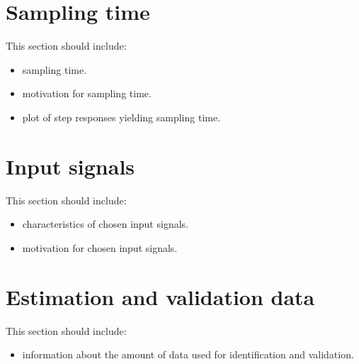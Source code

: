 \documentclass[10pt,a4paper]{article}
\begin{document}
\section{Sampling time}
This section should include:
\begin{itemize}
    \item sampling time.
    \item motivation for sampling time.
    \item plot of step responses yielding sampling time.
\end{itemize}

\section{Input signals}
This section should include:
\begin{itemize}
    \item characteristics of chosen input signals.
    \item motivation for chosen input signals.
\end{itemize}

\section{Estimation and validation data}
This section should include:
\begin{itemize}
    \item information about the amount of data used for identification and validation.
\end{itemize}

\end{document}
